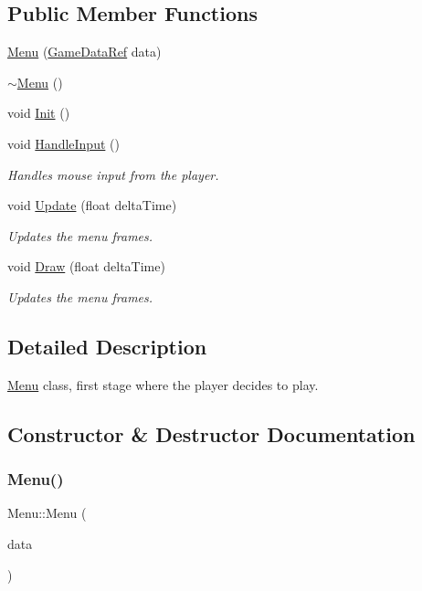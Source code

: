\subsection*{Public Member Functions}
\begin{DoxyCompactItemize}
\item 
\mbox{\hyperlink{classMenu_a15b3521b67715170d4aaa6324003cc11}{Menu}} (\mbox{\hyperlink{Game_8h_aff850703a7797c8bfee2f02906aec50c}{Game\+Data\+Ref}} data)
\item 
\mbox{\hyperlink{classMenu_a831387f51358cfb88cd018e1777bc980}{$\sim$\+Menu}} ()
\item 
void \mbox{\hyperlink{classMenu_a2d4c37774fe4c5efe08ee436b0bb1c76}{Init}} ()
\item 
void \mbox{\hyperlink{classMenu_a0cb3596524ed7fd021f999860b563bf8}{Handle\+Input}} ()
\begin{DoxyCompactList}\small\item\em Handles mouse input from the player. \end{DoxyCompactList}\item 
void \mbox{\hyperlink{classMenu_a4d5311d60fb41b4d0498a6fc820088be}{Update}} (float delta\+Time)
\begin{DoxyCompactList}\small\item\em Updates the menu frames. \end{DoxyCompactList}\item 
void \mbox{\hyperlink{classMenu_a510885af1fe41d02c1669fca278f7eed}{Draw}} (float delta\+Time)
\begin{DoxyCompactList}\small\item\em Updates the menu frames. \end{DoxyCompactList}\end{DoxyCompactItemize}


\subsection{Detailed Description}
\mbox{\hyperlink{classMenu}{Menu}} class, first stage where the player decides to play. 

\subsection{Constructor \& Destructor Documentation}
\mbox{\label{classMenu_a15b3521b67715170d4aaa6324003cc11}} 
\subsubsection{\texorpdfstring{Menu()}{Menu()}}
{\footnotesize\ttfamily Menu\+::\+Menu (\begin{DoxyParamCaption}\item[{\mbox{\hyperlink{Game_8h_aff850703a7797c8bfee2f02906aec50c}{Game\+Data\+Ref}}}]{data }\end{DoxyParamCaption})}

